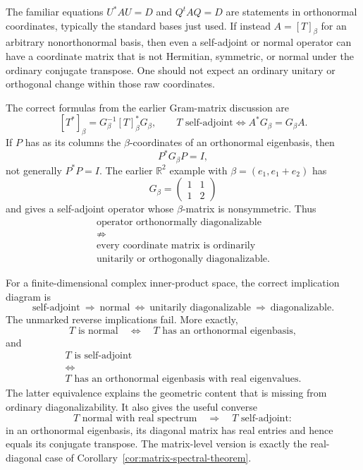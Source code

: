 \begin{remark}
The familiar equations \(U^*AU=D\) and \(Q^tAQ=D\) are statements in
orthonormal coordinates, typically the standard bases just used.  If instead
\(A=[T]_\beta\) for an arbitrary nonorthonormal basis, then even a self-adjoint
or normal operator can have a coordinate matrix that is not Hermitian,
symmetric, or normal under the ordinary conjugate transpose.  One should not
expect an ordinary unitary or orthogonal change within those raw coordinates.

The correct formulas from the earlier Gram-matrix discussion are
\[
[T^*]_\beta=G_\beta^{-1}[T]_\beta^*G_\beta,
\qquad
T\text{ self-adjoint}\Longleftrightarrow A^*G_\beta=G_\beta A.
\]
If \(P\) has as its columns the \(\beta\)-coordinates of an orthonormal
eigenbasis, then
\[
P^*G_\beta P=I,
\]
not generally \(P^*P=I\).  The earlier \(\mathbb R^2\) example with
\(\beta=(e_1,e_1+e_2)\) has
\[
G_\beta=\begin{pmatrix}1&1\\1&2\end{pmatrix}
\]
and gives a self-adjoint operator whose \(\beta\)-matrix is nonsymmetric.
Thus
\[
\begin{gathered}
\text{operator orthonormally diagonalizable}\\
\not\Longrightarrow\\
\text{every coordinate matrix is ordinarily}\\
\text{unitarily or orthogonally diagonalizable}.
\end{gathered}
\]
\end{remark}

\begin{remark}
For a finite-dimensional complex inner-product space, the correct implication
diagram is
\[
\text{self-adjoint}
\ \Longrightarrow\
\text{normal}
\ \Longleftrightarrow\
\text{unitarily diagonalizable}
\ \Longrightarrow\
\text{diagonalizable}.
\]
The unmarked reverse implications fail.  More exactly,
\[
T\text{ is normal}
\quad\Longleftrightarrow\quad
T\text{ has an orthonormal eigenbasis},
\]
and
\[
\begin{gathered}
T\text{ is self-adjoint}\\
\Longleftrightarrow\\
T\text{ has an orthonormal eigenbasis with real eigenvalues}.
\end{gathered}
\]
The latter equivalence explains the geometric content that is missing from
ordinary diagonalizability.  It also gives the useful converse
\[
T\text{ normal with real spectrum}
\quad\Longrightarrow\quad
T\text{ self-adjoint}:
\]
in an orthonormal eigenbasis, its diagonal matrix has real entries and hence
equals its conjugate transpose.  The matrix-level version is exactly the
real-diagonal case of Corollary~\ref{cor:matrix-spectral-theorem}.
\end{remark}

